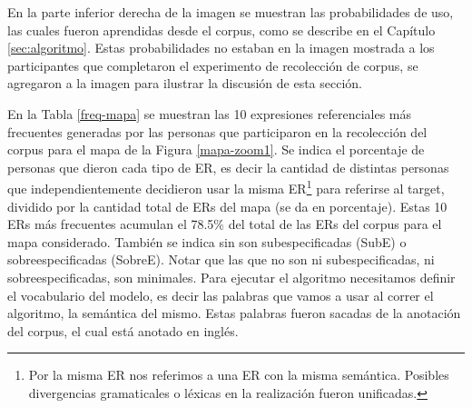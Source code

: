 En la parte inferior derecha de la imagen se muestran las probabilidades de uso, las cuales fueron aprendidas desde el corpus, como se describe en el Cap\'itulo \ref{sec:algoritmo}. Estas probabilidades no estaban en la imagen mostrada a los participantes que completaron el experimento de recolecci\'on de corpus, se agregaron a la imagen para ilustrar la discusi\'on de esta secci\'on.

En la Tabla \ref{freq-mapa} se muestran las 10 expresiones referenciales m\'as frecuentes generadas por las personas que participaron 
en la recolecci\'on del corpus para el mapa de la Figura \ref{mapa-zoom1}. Se indica el porcentaje de personas que dieron cada tipo de ER, es decir la cantidad de distintas personas que independientemente decidieron usar la misma ER\footnote{Por la misma ER nos referimos a una ER con la misma sem\'antica. Posibles divergencias gramaticales o l\'exicas en la realizaci\'on fueron unificadas.} para referirse al target, dividido por la cantidad total de ERs del mapa (se da en porcentaje). Estas 10 ERs m\'as frecuentes acumulan el 78.5\% del total de las ERs del corpus para el mapa considerado. Tambi\'en se indica sin son subespecificadas (SubE) o sobreespecificadas (SobreE). Notar que las que no son ni subespecificadas, ni sobreespecificadas, son minimales. Para ejecutar el algoritmo necesitamos definir el vocabulario del modelo, es decir las palabras que vamos a usar al correr el algoritmo, la sem\'antica del mismo. Estas palabras fueron sacadas de la anotaci\'on del corpus, el cual est\'a anotado en ingl\'es.

